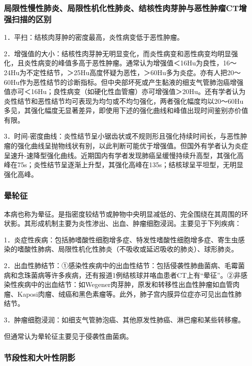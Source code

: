 \subsubsection{局限性慢性肺炎、局限性机化性肺炎、结核性肉芽肿与恶性肿瘤CT增强扫描的区别}

1．平扫：结核肉芽肿的密度最高，炎性病变低于恶性肿瘤。

2．增强值的大小：结核性肉芽肿无明显变化，而炎性病变和恶性病变均明显强化，且炎性病变的峰值多高于恶性肿瘤。通常认为增强值＜16Hu为良性，16～24Hu为不定性结节，＞25Hu高度怀疑为恶性，＞60Hu多为炎症。亦有人把20～60Hu作为恶性结节的诊断指标。但中央部坏死或产生黏液的细支气管肺泡癌增强值亦可＜16Hu；良性病变（如硬化性血管瘤）亦可增强值＞20Hu。还有学者认为炎性结节和恶性结节均可表现为均匀或不均匀强化，两者强化幅度均以20～60Hu多见，其强化幅度无显著差异，即使用下述的强化曲线和峰值出现时间鉴别亦价值有限。

3．时间-密度曲线：炎性结节呈小锯齿状或不规则形且强化持续时间长，与恶性肿瘤的强化曲线呈抛物线状有别，以此判断可能优于增强值。但国外有学者认为炎症呈速升-速降型强化曲线。近期国内有学者发现肺癌呈缓慢持续升高型，其强化高峰在75s；炎性结节呈逐渐上升型，其强化高峰在135s；结核球呈平坦型，无明显强化高峰。

\subsubsection{晕轮征}

本病也称为晕征。是指密度较结节或肿物中央明显减低的、完全围绕在其周围的环状影。其形成机制主要为炎性渗出、出血、肿瘤细胞浸润。主要见于下列疾病：

1．炎症性疾病：包括肺嗜酸性细胞增多症、特发性嗜酸性细胞增多症、寄生虫感染的嗜酸性肺病、局限性机化性肺炎（不吸收或延迟吸收的肺炎）、球形肺炎。

2．出血性肺结节：①感染性疾病中的出血性结节：包括侵袭性肺曲菌病、毛霉菌病和念珠菌病等许多疾病，还有报道1例结核球并咯血患者CT上有“晕征”。②非感染性疾病中的出血结节：如Wegener肉芽肿，原发和转移性出血性肿瘤如血管肉瘤、Kaposi肉瘤、绒癌和黑色素瘤等。此外，肺子宫内膜异位症亦可见出血性肺结节。

3．肿瘤细胞浸润：如细支气管肺泡癌、其他原发性肺癌、淋巴瘤和某些转移瘤。

但通常认为晕轮征主要见于侵袭性曲菌病。

\subsubsection{节段性和大叶性阴影}

